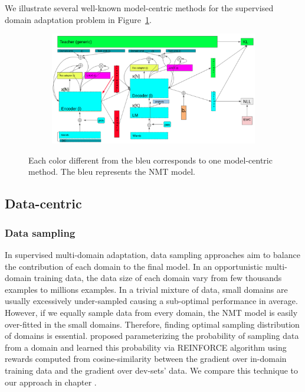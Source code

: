 We illustrate several well-known model-centric methods for the supervised domain adaptation problem in Figure~\ref{fig:model-centric-case1-case2}.
\begin{figure}[htbp]
\begin{subfigure}{1.0\textwidth}
  \centering
  \includegraphics[width=1.0\textwidth]{graphics/supervised_mdmt}
\end{subfigure}
\newline
\begin{subfigure}{1.0\textwidth}
  \centering
\end{subfigure}
\caption[Model-centric's brief overview]{Each color different from the bleu corresponds to one model-centric method. The bleu represents the NMT model.}
\label{fig:model-centric-case1-case2}
\end{figure}

\subsection{Data-centric}
\subsubsection{Data sampling}
In supervised multi-domain adaptation, data sampling approaches aim to balance the contribution of each domain to the final model. In an opportunistic multi-domain training data, the data size of each domain vary from few thousands examples to millions examples. In a trivial mixture of data, small domains are usually excessively under-sampled causing a sub-optimal performance in average. However, if we equally sample data from every domain, the NMT model is easily over-fitted in the small domains. Therefore, finding optimal sampling distribution of domains is essential. \cite{Wang20balancing} proposed parameterizing the probability of sampling data from a domain and learned this probability via REINFORCE algorithm \citet{Williams92simple} using rewards computed from cosine-similarity between the gradient over in-domain training data and the gradient over dev-sets' data. We compare this technique to our approach in chapter .

